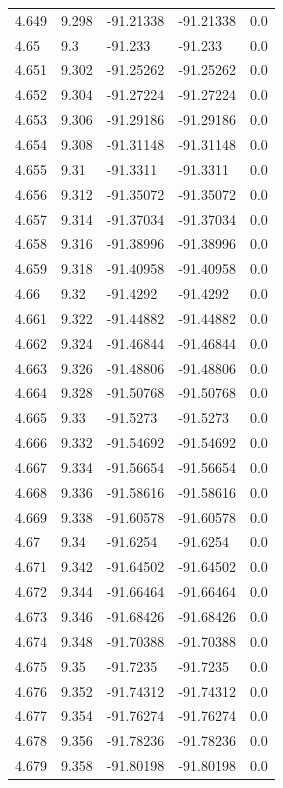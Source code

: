 \begin{tabular}{lllll}
4.649 & 9.298 & -91.21338 & -91.21338 & 0.0 \\
4.65 & 9.3 & -91.233 & -91.233 & 0.0 \\
4.651 & 9.302 & -91.25262 & -91.25262 & 0.0 \\
4.652 & 9.304 & -91.27224 & -91.27224 & 0.0 \\
4.653 & 9.306 & -91.29186 & -91.29186 & 0.0 \\
4.654 & 9.308 & -91.31148 & -91.31148 & 0.0 \\
4.655 & 9.31 & -91.3311 & -91.3311 & 0.0 \\
4.656 & 9.312 & -91.35072 & -91.35072 & 0.0 \\
4.657 & 9.314 & -91.37034 & -91.37034 & 0.0 \\
4.658 & 9.316 & -91.38996 & -91.38996 & 0.0 \\
4.659 & 9.318 & -91.40958 & -91.40958 & 0.0 \\
4.66 & 9.32 & -91.4292 & -91.4292 & 0.0 \\
4.661 & 9.322 & -91.44882 & -91.44882 & 0.0 \\
4.662 & 9.324 & -91.46844 & -91.46844 & 0.0 \\
4.663 & 9.326 & -91.48806 & -91.48806 & 0.0 \\
4.664 & 9.328 & -91.50768 & -91.50768 & 0.0 \\
4.665 & 9.33 & -91.5273 & -91.5273 & 0.0 \\
4.666 & 9.332 & -91.54692 & -91.54692 & 0.0 \\
4.667 & 9.334 & -91.56654 & -91.56654 & 0.0 \\
4.668 & 9.336 & -91.58616 & -91.58616 & 0.0 \\
4.669 & 9.338 & -91.60578 & -91.60578 & 0.0 \\
4.67 & 9.34 & -91.6254 & -91.6254 & 0.0 \\
4.671 & 9.342 & -91.64502 & -91.64502 & 0.0 \\
4.672 & 9.344 & -91.66464 & -91.66464 & 0.0 \\
4.673 & 9.346 & -91.68426 & -91.68426 & 0.0 \\
4.674 & 9.348 & -91.70388 & -91.70388 & 0.0 \\
4.675 & 9.35 & -91.7235 & -91.7235 & 0.0 \\
4.676 & 9.352 & -91.74312 & -91.74312 & 0.0 \\
4.677 & 9.354 & -91.76274 & -91.76274 & 0.0 \\
4.678 & 9.356 & -91.78236 & -91.78236 & 0.0 \\
4.679 & 9.358 & -91.80198 & -91.80198 & 0.0 \\

\end{tabular}
